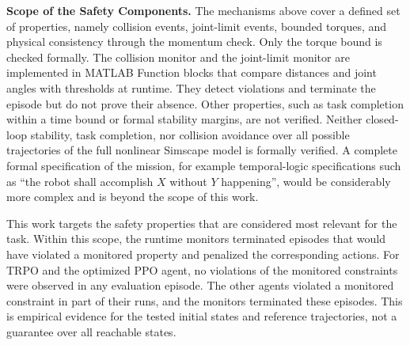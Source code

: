 \documentclass{ieeeaccess}
\begin{document}
\textbf{Scope of the Safety Components.} The mechanisms above cover a defined set of properties, namely
collision events, joint-limit events, bounded torques, and physical consistency through the momentum
check. Only the torque bound is checked formally. The collision monitor and the joint-limit monitor are
implemented in MATLAB Function blocks that compare distances and joint angles with thresholds at runtime.
They detect violations and terminate the episode but do not prove their absence. Other properties, such
as task completion within a time bound or formal stability margins, are not verified. Neither
closed-loop stability, task completion, nor collision avoidance over all possible trajectories of the
full nonlinear Simscape model is formally verified. A complete formal specification of the mission, for
example temporal-logic specifications such as ``the robot shall accomplish $X$ without $Y$ happening'',
would be considerably more complex and is beyond the scope of this work.

This work targets the safety properties that are considered most relevant for the task. Within this
scope, the runtime monitors terminated episodes that would have violated a monitored property and
penalized the corresponding actions. For TRPO and the optimized PPO agent, no violations of the monitored
constraints were observed in any evaluation episode. The other agents violated a monitored constraint in
part of their runs, and the monitors terminated these episodes. This is empirical evidence for the tested
initial states and reference trajectories, not a guarantee over all reachable states.
\end{document}
